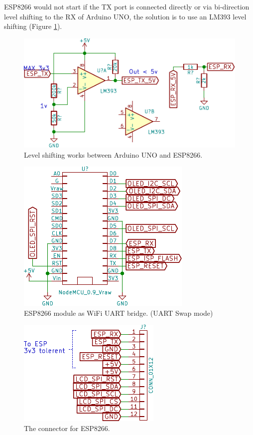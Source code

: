 \documentclass[a4paper,10pt]{article}
\begin{document}
ESP8266 would not start if the TX port is connected directly or via bi-direction level shifting to the RX of Arduino UNO, the solution is to use an LM393 level shifting (Figure \ref{fig:levelshift}).

\begin{figure}[h!t] \centering
    \includegraphics[width=0.8\linewidth]{figures/sch-smartshow-levelshift.pdf}
    \caption{Level shifting works between Arduino UNO and ESP8266.} \label{fig:levelshift}
\end{figure}



\begin{figure}[h!t] \centering
    \includegraphics{figures/sch-smartshow-esp8266.pdf}
    \caption{ESP8266 module as WiFi UART bridge. (UART Swap mode)} \label{fig:smartshow-esp8266}
\end{figure}


\begin{figure}[h!t] \centering
    \includegraphics{figures/sch-smartshow-port.pdf}
    \caption{The connector for ESP8266.} \label{fig:smartshow-port}
\end{figure}
\end{document}
